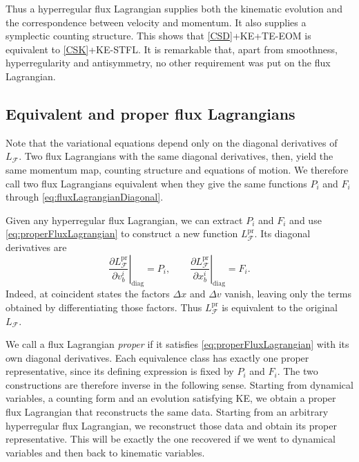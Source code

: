 \documentclass[12pt]{article}
\begin{document}
Thus a hyperregular flux Lagrangian supplies both the kinematic evolution and the correspondence between velocity and momentum. It also supplies a symplectic counting structure. This shows that \ref{CSD}+KE+TE-EOM is equivalent to \ref{CSK}+KE-STFL. It is remarkable that, apart from smoothness, hyperregularity and antisymmetry, no other requirement was put on the flux Lagrangian.

\subsection{Equivalent and proper flux Lagrangians}

Note that the variational equations depend only on the diagonal derivatives of $L_{\mathcal{F}}$. Two flux Lagrangians with the same diagonal derivatives, then, yield the same momentum map, counting structure and equations of motion. We therefore call two flux Lagrangians equivalent when they give the same functions $P_i$ and $F_i$ through \eqref{eq:fluxLagrangianDiagonal}.

Given any hyperregular flux Lagrangian, we can extract $P_i$ and $F_i$ and use \eqref{eq:properFluxLagrangian} to construct a new function $L_{\mathcal{F}}^{\mathrm{pr}}$. Its diagonal derivatives are
\begin{equation}
	\left.\frac{\partial L_{\mathcal{F}}^{\mathrm{pr}}}{\partial v_b^i}\right|_{\mathrm{diag}}
	=P_i,
	\qquad
	\left.\frac{\partial L_{\mathcal{F}}^{\mathrm{pr}}}{\partial x_b^i}\right|_{\mathrm{diag}}
	=F_i.
\end{equation}
Indeed, at coincident states the factors $\Delta x$ and $\Delta v$ vanish, leaving only the terms obtained by differentiating those factors. Thus $L_{\mathcal{F}}^{\mathrm{pr}}$ is equivalent to the original $L_{\mathcal{F}}$.

We call a flux Lagrangian \emph{proper} if it satisfies \eqref{eq:properFluxLagrangian} with its own diagonal derivatives. Each equivalence class has exactly
one proper representative, since its defining expression is fixed by $P_i$ and $F_i$. The two constructions are therefore inverse in the following sense. Starting from dynamical variables, a counting form and an evolution satisfying KE, we obtain a proper flux Lagrangian that reconstructs the same data. Starting from an arbitrary hyperregular flux Lagrangian, we reconstruct those data and obtain its proper representative. This will be exactly the one recovered if we went to dynamical variables and then back to kinematic variables.
\end{document}
